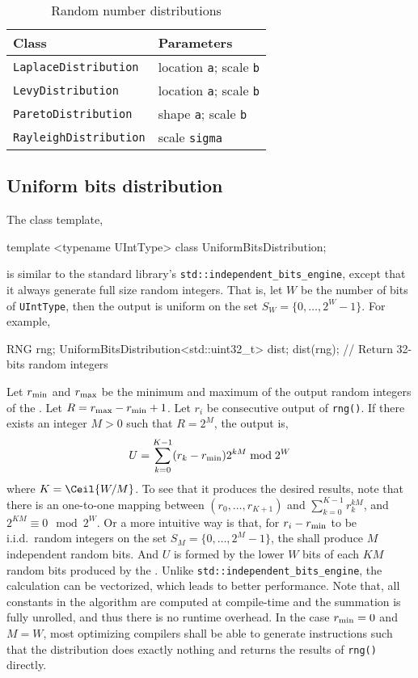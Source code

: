 \begin{table}
  \begin{tabularx}{\textwidth}{lX}
    \toprule
    Class & Parameters \\
    \midrule
    \verb|LaplaceDistribution|  & location \verb|a|; scale \verb|b| \\
    \verb|LevyDistribution|     & location \verb|a|; scale \verb|b| \\
    \verb|ParetoDistribution|   & shape \verb|a|; scale \verb|b| \\
    \verb|RayleighDistribution| & scale \verb|sigma| \\
    \bottomrule
  \end{tabularx}
  \caption{Random number distributions}
  \label{tab:Random number distributions}
\end{table}

\subsection{Uniform bits distribution}
\label{sub:Uniform bits distribution}

The class template,
\begin{cppcode}
  template <typename UIntType>
  class UniformBitsDistribution;
\end{cppcode}
is similar to the standard library's \verb|std::independent_bits_engine|,
except that it always generate full size random integers. That is, let $W$ be
the number of bits of \verb|UIntType|, then the output is uniform on the set
$S_W = \{0,\dots,2^W - 1\}$. For example,
\begin{cppcode}
  RNG rng;
  UniformBitsDistribution<std::uint32_t> dist;
  dist(rng); // Return 32-bits random integers
\end{cppcode}
Let $r_{\mathrm{min}}$ and $r_{\mathrm{max}}$ be the minimum and maximum of the output random
integers of the \rng. Let $R = r_{\mathrm{max}} - r_{\mathrm{min}} + 1$. Let $r_i$ be consecutive
output of \verb|rng()|. If there exists an integer $M > 0$ such that $R = 2^M$,
the output is,
\begin{equation*}
  U = \sum_{k = 0}^{K - 1} (r_k - r_{\mathrm{min}}) 2^{kM} \bmod 2^W
\end{equation*}
where $K = \Ceil{W / M}$. To see that it produces the desired results, note
that there is an one-to-one mapping between $(r_0,\dots,r_{K + 1})$ and
$\sum_{k=0}^{K-1}r_k^{kM}$, and $2^{KM}\equiv0\mod2^W$. Or a more intuitive way
is that, for $r_i - r_{\mathrm{min}}$ to be i.i.d.\ random integers on the set $S_M =
\{0,\dots,2^M - 1\}$, the \rng shall produce $M$ independent random bits. And
$U$ is formed by the lower $W$ bits of each $KM$ random bits produced by the
\rng. Unlike \verb|std::independent_bits_engine|, the calculation can be
vectorized, which leads to better performance. Note that, all constants in the
algorithm are computed at compile-time and the summation is fully unrolled, and
thus there is no runtime overhead. In the case $r_{\mathrm{min}} = 0$ and $M = W$, most
optimizing compilers shall be able to generate instructions such that the
distribution does exactly nothing and returns the results of \verb|rng()|
directly.

